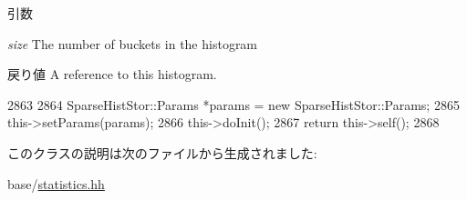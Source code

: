 \begin{DoxyParams}{引数}
\item[{\em size}]The number of buckets in the histogram \end{DoxyParams}
\begin{DoxyReturn}{戻り値}
A reference to this histogram. 
\end{DoxyReturn}



\begin{DoxyCode}
2863     {
2864         SparseHistStor::Params *params = new SparseHistStor::Params;
2865         this->setParams(params);
2866         this->doInit();
2867         return this->self();
2868     }
\end{DoxyCode}


このクラスの説明は次のファイルから生成されました:\begin{DoxyCompactItemize}
\item 
base/\hyperlink{statistics_8hh}{statistics.hh}\end{DoxyCompactItemize}
